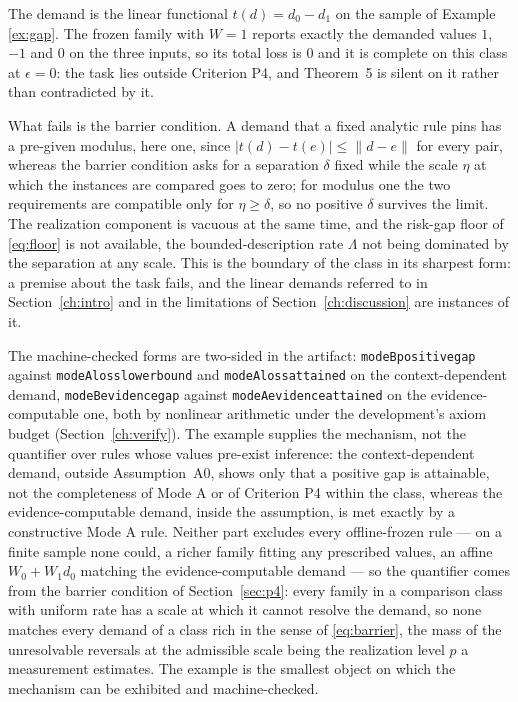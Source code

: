 \begin{example}
\label{ex:p4fails}
The demand is the linear functional $t(d) = d_0 - d_1$ on the sample of Example \ref{ex:gap}. The frozen family with $W = 1$ reports exactly the demanded values $1$, $-1$ and $0$ on the three inputs, so its total loss is $0$ and it is complete on this class at $\epsilon = 0$: the task lies outside Criterion P4, and Theorem~5 is silent on it rather than contradicted by it.

What fails is the barrier condition. A demand that a fixed analytic rule pins has a pre-given modulus, here one, since $|t(d) - t(e)| \le \| d - e \|$ for every pair, whereas the barrier condition asks for a separation $\delta$ fixed while the scale $\eta$ at which the instances are compared goes to zero; for modulus one the two requirements are compatible only for $\eta \ge \delta$, so no positive $\delta$ survives the limit. The realization component is vacuous at the same time, and the risk-gap floor of \eqref{eq:floor} is not available, the bounded-description rate $\Lambda$ not being dominated by the separation at any scale. This is the boundary of the class in its sharpest form: a premise about the task fails, and the linear demands referred to in Section~\ref{ch:intro} and in the limitations of Section~\ref{ch:discussion} are instances of it.
\end{example}

The machine-checked forms are two-sided in the artifact: \texttt{modeB\ttu positive\ttu gap} against \texttt{modeA\ttu loss\ttu lower\ttu bound} and \texttt{modeA\ttu loss\ttu attained} on the context-dependent demand, \texttt{modeB\ttu evidence\ttu gap} against \texttt{modeA\ttu evidence\ttu attained} on the evidence-computable one, both by nonlinear arithmetic under the development's axiom budget (Section~\ref{ch:verify}). The example supplies the mechanism, not the quantifier over rules whose values pre-exist inference: the context-dependent demand, outside Assumption~A0, shows only that a positive gap is attainable, not the completeness of Mode A or of Criterion P4 within the class, whereas the evidence-computable demand, inside the assumption, is met exactly by a constructive Mode A rule. Neither part excludes every offline-frozen rule --- on a finite sample none could, a richer family fitting any prescribed values, an affine $W_0 + W_1 d_0$ matching the evidence-computable demand --- so the quantifier comes from the barrier condition of Section~\ref{sec:p4}: every family in a comparison class with uniform rate has a scale at which it cannot resolve the demand, so none matches every demand of a class rich in the sense of \eqref{eq:barrier}, the mass of the unresolvable reversals at the admissible scale being the realization level $p$ a measurement estimates. The example is the smallest object on which the mechanism can be exhibited and machine-checked.

